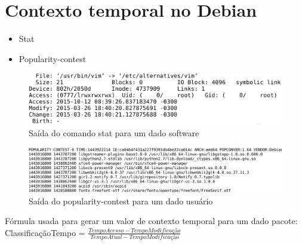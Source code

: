 \section{Contexto temporal no Debian} %
\label{sec:d}

\begin{frame}

    \begin{itemize}
        \item Stat
        \item Popularity-contest
    \end{itemize}

\end{frame}

\begin{frame}
\begin{figure}[h!]
    \centering
    \includegraphics[width=1\textwidth]{figura/comando_stat.eps}
    \caption{Saída do comando stat para um dado software}
\end{figure}
\end{frame}


\begin{frame}
\begin{figure}[h!]
    \centering
    \includegraphics[width=1\textwidth]{figura/popularity_contest.eps}
    \caption{Saída do popularity-contest para um dado usuário}
\end{figure}
\end{frame}


\begin{frame}

Fórmula usada para gerar um valor de contexto temporal para um dado pacote:
\newline
\newline
ClassificaçãoTempo = $\frac{TempoAcesso - TempoModificação}{TempoAtual -
TempoModificação}$

\end{frame}


